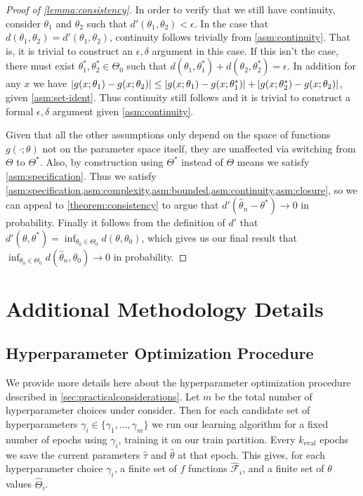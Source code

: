 \documentclass{article}
\theoremstyle{plain}
\theoremstyle{definition}
\begin{document}
\begin{proof}[Proof of \cref{lemma:consistency}]
In order to verify that we still have continuity, consider $\theta_1$ and $\theta_2$ such that $d'(\theta_1, \theta_2) < \epsilon$. In the case that $d(\theta_1, \theta_2) = d'(\theta_1, \theta_2)$, continuity follows trivially from \cref{asm:continuity}. That is, it is trivial to construct an $\epsilon,\delta$ argument in this case. If this isn't the case, there must exist $\theta_1^*, \theta_2^* \in \Theta_0$ such that $d(\theta_1, \theta_1^*) + d(\theta_2, \theta_2^*) = \epsilon$. In addition for any $x$ we have $\left|g(x;\theta_1) - g(x;\theta_2)\right| \leq \left|g(x;\theta_1) - g(x;\theta_1^*)\right| + \left|g(x;\theta_2^*) - g(x;\theta_2)\right|$, given \cref{asm:set-ident}. Thus continuity still follows and it is trivial to construct a formal $\epsilon,\delta$ argument given \cref{asm:continuity}.

Given that all the other assumptions only depend on the space of functions $g(\cdot;\theta)$ not on the parameter space itself, they are unaffected via switching from $\Theta$ to $\Theta^*$. Also, by construction using $\Theta^*$ instead of $\Theta$ means we satisfy \cref{asm:specification}. Thus we satisfy \cref{asm:specification,asm:complexity,asm:bounded,asm:continuity,asm:closure}, so we can appeal to \cref{theorem:consistency} to argue that $d'(\hat\theta_n - \theta^*) \to 0$ in probability. Finally it follows from the definition of $d'$ that $d'(\theta, \theta^*) = \inf_{\theta_0 \in \Theta_0} d(\theta, \theta_0)$, which gives us our final result that $\inf_{\theta_0 \in \Theta_0} d(\hat\theta_n, \theta_0) \to 0$ in probability.
\end{proof}


\section{Additional Methodology Details}
\subsection{Hyperparameter Optimization Procedure}
\label{apx:model-selection}

We provide more details here about the hyperparameter optimization procedure described in \cref{sec:practicalconsiderations}. Let $m$ be the total number of hyperparameter choices under consider. Then for each candidate set of hyperparameters $\gamma_i \in \{\gamma_1,\ldots,\gamma_m\}$ we run our learning algorithm for a fixed number of epochs using $\gamma_i$, training it on our train partition. Every $k_{\text{eval}}$ epochs we save the current parameters $\hat \tau$ and $\hat \theta$ at that epoch. This gives, for each hyperparameter choice $\gamma_i$, a finite set of $f$ functions $\hat{\mathcal{F}}_i$, and a finite set of $\theta$ values $\hat{\Theta}_i$.
\end{document}
